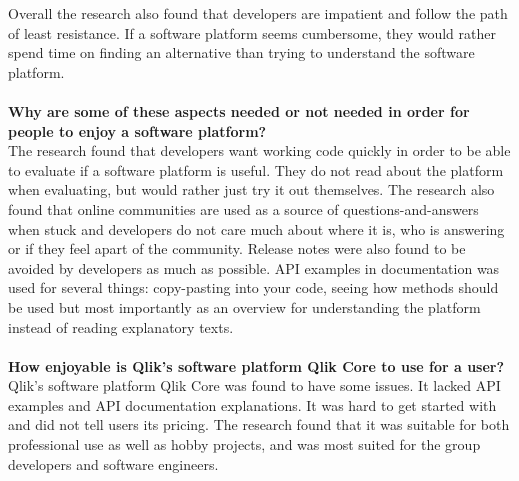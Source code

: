 \documentclass{cslthse-msc}
\begin{document}
    Overall the research also found that developers are impatient and follow the path of least resistance. If a software platform seems cumbersome, they would rather spend time on finding an alternative than trying to understand the software platform.\\\\
    \textbf{Why are some of these aspects needed or not needed in order for people to enjoy a software platform?}\\
    The research found that developers want working code quickly in order to be able to evaluate if a software platform is useful. They do not read about the platform when evaluating, but would rather just try it out themselves. The research also found that online communities are used as a source of questions-and-answers when stuck and developers do not care much about where it is, who is answering or if they feel apart of the community. Release notes were also found to be avoided by developers as much as possible. API examples in documentation was used for several things: copy-pasting into your code, seeing how methods should be used but most importantly as an overview for understanding the platform instead of reading explanatory texts.\\\\
    \textbf{How enjoyable is Qlik's software platform Qlik Core to use for a user?}\\
    Qlik's software platform Qlik Core was found to have some issues. It lacked API examples and API documentation explanations. It was hard to get started with and did not tell users its pricing. The research found that it was suitable for both professional use as well as hobby projects, and was most suited for the group developers and software engineers.\\\\
\end{document}
